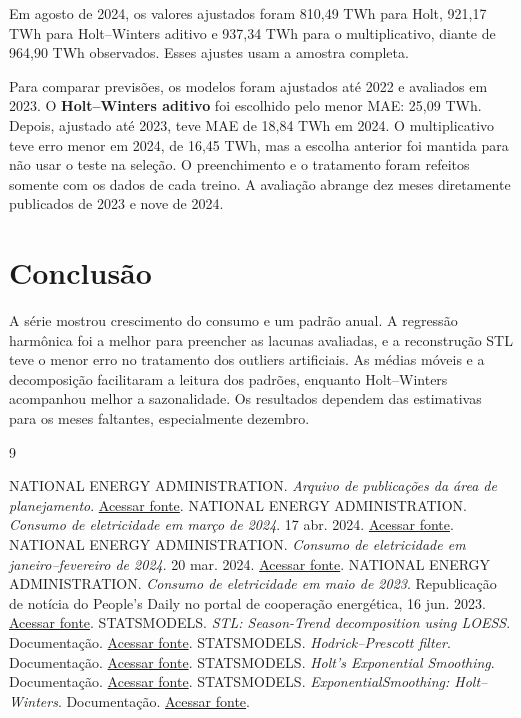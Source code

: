 \documentclass[11pt,a4paper]{article}
\begin{document}
Em agosto de 2024, os valores ajustados foram 810,49 TWh para Holt, 921,17 TWh para Holt--Winters aditivo e 937,34 TWh para o multiplicativo, diante de 964,90 TWh observados. Esses ajustes usam a amostra completa.

Para comparar previsões, os modelos foram ajustados até 2022 e avaliados em 2023. O \textbf{Holt--Winters aditivo} foi escolhido pelo menor MAE: 25,09 TWh. Depois, ajustado até 2023, teve MAE de 18,84 TWh em 2024. O multiplicativo teve erro menor em 2024, de 16,45 TWh, mas a escolha anterior foi mantida para não usar o teste na seleção. O preenchimento e o tratamento foram refeitos somente com os dados de cada treino. A avaliação abrange dez meses diretamente publicados de 2023 e nove de 2024.

\section*{Conclusão}
A série mostrou crescimento do consumo e um padrão anual. A regressão harmônica foi a melhor para preencher as lacunas avaliadas, e a reconstrução STL teve o menor erro no tratamento dos outliers artificiais. As médias móveis e a decomposição facilitaram a leitura dos padrões, enquanto Holt--Winters acompanhou melhor a sazonalidade. Os resultados dependem das estimativas para os meses faltantes, especialmente dezembro.

\begin{thebibliography}{9}
\footnotesize\raggedright\setlength{\itemsep}{0pt}
 NATIONAL ENERGY ADMINISTRATION. \textit{Arquivo de publicações da área de planejamento}. \href{https://www.nea.gov.cn/sjzz/ghs/zjgx.htm}{Acessar fonte}.
 NATIONAL ENERGY ADMINISTRATION. \textit{Consumo de eletricidade em março de 2024}. 17 abr. 2024. \href{https://www.nea.gov.cn/2024-04/17/c_1310771602.htm}{Acessar fonte}.
 NATIONAL ENERGY ADMINISTRATION. \textit{Consumo de eletricidade em janeiro--fevereiro de 2024}. 20 mar. 2024. \href{https://www.nea.gov.cn/2024-03/20/c_1310768302.htm}{Acessar fonte}.
 NATIONAL ENERGY ADMINISTRATION. \textit{Consumo de eletricidade em maio de 2023}. Republicação de notícia do People's Daily no portal de cooperação energética, 16 jun. 2023. \href{https://obor.nea.gov.cn/detail/19346.html}{Acessar fonte}.
 STATSMODELS. \textit{STL: Season-Trend decomposition using LOESS}. Documentação. \href{https://www.statsmodels.org/stable/generated/statsmodels.tsa.seasonal.STL.html}{Acessar fonte}.
 STATSMODELS. \textit{Hodrick--Prescott filter}. Documentação. \href{https://www.statsmodels.org/stable/generated/statsmodels.tsa.filters.hp_filter.hpfilter.html}{Acessar fonte}.
 STATSMODELS. \textit{Holt's Exponential Smoothing}. Documentação. \href{https://www.statsmodels.org/stable/generated/statsmodels.tsa.holtwinters.Holt.html}{Acessar fonte}.
 STATSMODELS. \textit{ExponentialSmoothing: Holt--Winters}. Documentação. \href{https://www.statsmodels.org/stable/generated/statsmodels.tsa.holtwinters.ExponentialSmoothing.html}{Acessar fonte}.
\end{thebibliography}
\end{document}
